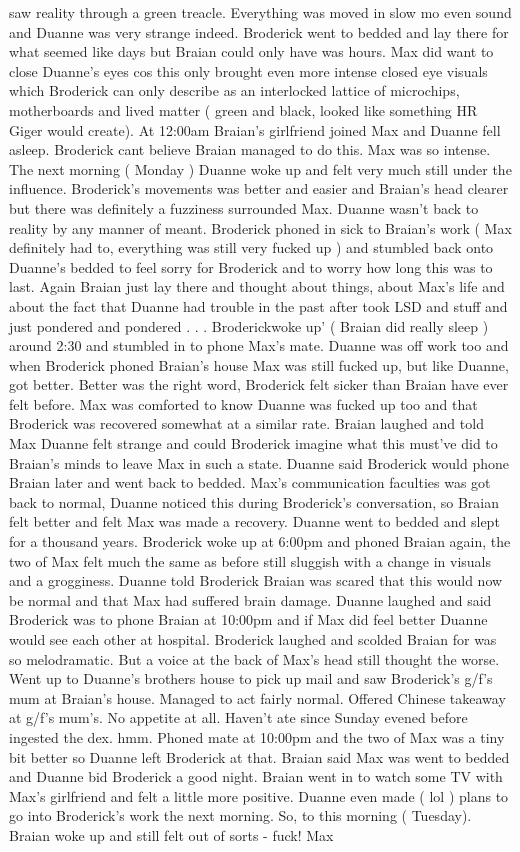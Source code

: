 \documentclass[12pt]{book}
\begin{document}
saw reality through a green treacle. Everything was moved in slow mo even sound and Duanne was very strange indeed. Broderick went to bedded and lay there for what seemed like days but Braian could only have was hours. Max did want to close Duanne's eyes cos this only brought even more intense closed eye visuals which Broderick can only describe as an interlocked lattice of microchips, motherboards and lived matter ( green and black, looked like something HR Giger would create). At 12:00am Braian's girlfriend joined Max and Duanne fell asleep. Broderick cant believe Braian managed to do this. Max was so intense. The next morning ( Monday ) Duanne woke up and felt very much still under the influence. Broderick's movements was better and easier and Braian's head clearer but there was definitely a fuzziness surrounded Max. Duanne wasn't back to reality by any manner of meant. Broderick phoned in sick to Braian's work ( Max definitely had to, everything was still very fucked up ) and stumbled back onto Duanne's bedded to feel sorry for Broderick and to worry how long this was to last. Again Braian just lay there and thought about things, about Max's life and about the fact that Duanne had trouble in the past after took LSD and stuff and just pondered and pondered . . .  Broderickwoke up' ( Braian did really sleep ) around 2:30 and stumbled in to phone Max's mate. Duanne was off work too and when Broderick phoned Braian's house Max was still fucked up, but like Duanne, got better. Better was the right word, Broderick felt sicker than Braian have ever felt before. Max was comforted to know Duanne was fucked up too and that Broderick was recovered somewhat at a similar rate. Braian laughed and told Max Duanne felt strange and could Broderick imagine what this must've did to Braian's minds to leave Max in such a state. Duanne said Broderick would phone Braian later and went back to bedded. Max's communication faculties was got back to normal, Duanne noticed this during Broderick's conversation, so Braian felt better and felt Max was made a recovery. Duanne went to bedded and slept for a thousand years. Broderick woke up at 6:00pm and phoned Braian again, the two of Max felt much the same as before still sluggish with a change in visuals and a grogginess. Duanne told Broderick Braian was scared that this would now be normal and that Max had suffered brain damage. Duanne laughed and said Broderick was to phone Braian at 10:00pm and if Max did feel better Duanne would see each other at hospital. Broderick laughed and scolded Braian for was so melodramatic. But a voice at the back of Max's head still thought the worse. Went up to Duanne's brothers house to pick up mail and saw Broderick's g/f's mum at Braian's house. Managed to act fairly normal. Offered Chinese takeaway at g/f's mum's. No appetite at all. Haven't ate since Sunday evened before ingested the dex. hmm. Phoned mate at 10:00pm and the two of Max was a tiny bit better so Duanne left Broderick at that. Braian said Max was went to bedded and Duanne bid Broderick a good night. Braian went in to watch some TV with Max's girlfriend and felt a little more positive. Duanne even made ( lol ) plans to go into Broderick's work the next morning. So, to this morning ( Tuesday). Braian woke up and still felt out of sorts - fuck! Max 
\end{document}
